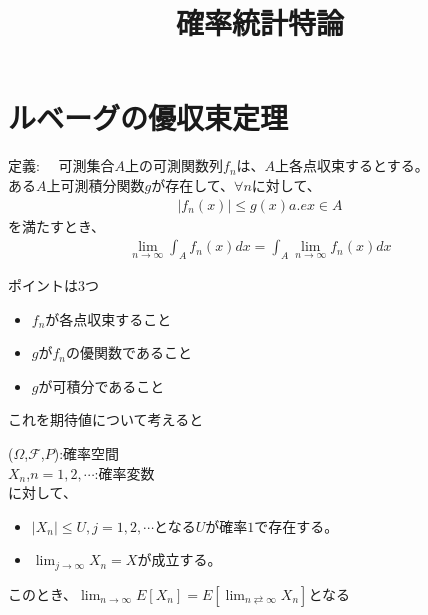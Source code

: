 \documentclass[12pt]{jarticle}
\title{確率統計特論}
\begin{document}
\maketitle
\section{ルベーグの優収束定理}
\begin{shadebox}
  定義: \ \ 可測集合$A$上の可測関数列${f_n}$は、$A$上各点収束するとする。\\ ある$A$上可測積分関数$g$が存在して、$\forall n$に対して、
  \begin{align*}
    |f_n(x)| \leq g(x) a.e x \in A
  \end{align*}
を満たすとき、
\begin{align*}
  \lim_{n \rightarrow \infty} \int_A f_n (x) dx = \int_A \lim_{n \rightarrow \infty}  f_n (x) dx
\end{align*}
\end{shadebox}

ポイントは$3$つ
\begin{itemize}
  \item ${f_n}$が各点収束すること
  \item $g$が${f_n}$の優関数であること
  \item $g$が可積分であること
\end{itemize}
これを期待値について考えると
\begin{shadebox}
  ($\Omega$,$\mathscr{F}$,$P$):確率空間\\ $X_n$,$n=1,2,\cdots$:確率変数\\
  に対して、
  \begin{itemize}
    \item $|X_n| \leq U,j = 1,2,\cdots $となる$U$が確率$1$で存在する。
    \item $\displaystyle \lim_{j \rightarrow \infty} X_n = X$が成立する。
  \end{itemize}
  このとき、$\displaystyle \lim_{n \rightarrow \infty} E[X_n] = E[\lim_{n \rightleftarrows \infty}X_n]$となる
\end{shadebox}
\end{document}
